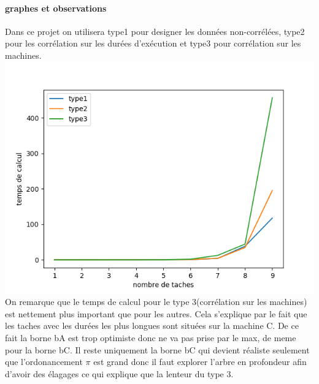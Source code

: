 \documentclass[a4paper, 10pt]{article}
\begin{document}
                \paragraph{graphes et observations}{

                  Dans ce projet on utilisera type1 pour designer les données non-corrélées, type2 pour les corrélation sur les durées d'exécution et type3 pour corrélation sur les machines.\\

                  \includegraphics{graphes/exacte_b1.png}
                  On remarque que le temps de calcul pour le type 3(corrélation sur les machines) est nettement plus important que pour les autres. Cela s'explique par le fait que les taches avec les durées les plus longues sont situées sur la machine C. De ce fait la borne bA est trop optimiste donc ne va pas prise par le max, de meme pour la borne bC. Il reste uniquement la borne bC qui devient réaliste seulement que l'ordonancement $\pi$ est grand donc il faut explorer l'arbre en profondeur afin d'avoir des élagages ce qui explique que la lenteur du type 3.
                  
                }
\end{document}
